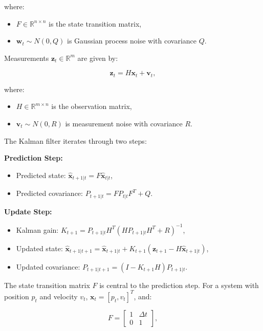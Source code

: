 \documentclass[12pt]{article}
\begin{document}
where:
\begin{itemize}
    \item \( F \in \mathbb{R}^{n \times n} \) is the state transition matrix,
    \item \( \mathbf{w}_t \sim N(0, Q) \) is Gaussian process noise with covariance \( Q \).
\end{itemize}

Measurements \( \mathbf{z}_t \in \mathbb{R}^m \) are given by:

\begin{equation}
    \mathbf{z}_t = H \mathbf{x}_t + \mathbf{v}_t,
    \label{eq:measurement}
\end{equation}

where:
\begin{itemize}
    \item \( H \in \mathbb{R}^{m \times n} \) is the observation matrix,
    \item \( \mathbf{v}_t \sim N(0, R) \) is measurement noise with covariance \( R \).
\end{itemize}

The Kalman filter iterates through two steps:

\textbf{Prediction Step:}
\begin{itemize}
    \item Predicted state: \( \hat{\mathbf{x}}_{t+1|t} = F \hat{\mathbf{x}}_{t|t} \),
    \item Predicted covariance: \( P_{t+1|t} = F P_{t|t} F^T + Q \).
\end{itemize}

\textbf{Update Step:}
\begin{itemize}
    \item Kalman gain: \( K_{t+1} = P_{t+1|t} H^T (H P_{t+1|t} H^T + R)^{-1} \),
    \item Updated state: \( \hat{\mathbf{x}}_{t+1|t+1} = \hat{\mathbf{x}}_{t+1|t} + K_{t+1} (\mathbf{z}_{t+1} - H \hat{\mathbf{x}}_{t+1|t}) \),
    \item Updated covariance: \( P_{t+1|t+1} = (I - K_{t+1} H) P_{t+1|t} \).
\end{itemize}

The state transition matrix \( F \) is central to the prediction step. For a system with position \( p_t \) and velocity \( v_t \), \( \mathbf{x}_t = [p_t, v_t]^T \), and:

\begin{equation}
    F = \begin{bmatrix} 1 & \Delta t \\ 0 & 1 \end{bmatrix},
    \label{eq:ideal_F}
\end{equation}
\end{document}
